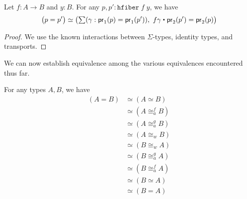 \begin{lem}\label{lem:hfib}
Let $f : A \to B$ and $y : B$. For any $p, p' : \mathtt{hfiber} \; f \;y$, we have
\[ \big(p = p'\big) \simeq \big(\sm{\gamma : \proj{1}(p) = \proj{1}(p')} f\gamma \ct \proj{2}(p') = \proj{2}(p) \big) \]
\end{lem}
\begin{proof}
We use the known interactions between $\Sigma$-types, identity types, and transports.
\end{proof}

We can now establish equivalence among the various equivalences encountered thus far.

\begin{thm}\label{thm:equivs-equiv}
For any types $A, B$, we have 
\begin{align*}
(A = B) & \simeq (A \simeq B) \\
       & \simeq (A\cong^f_a B) \\
       & \simeq (A\cong^g_a B) \\
       & \simeq (A \cong_w B) \\
       & \simeq (B \cong_w A) \\
        & \simeq (B\cong^g_a A) \\
        & \simeq (B\cong^f_a A) \\
        & \simeq (B \simeq A) \\
        & \simeq (B = A)
\end{align*}
\end{thm}

